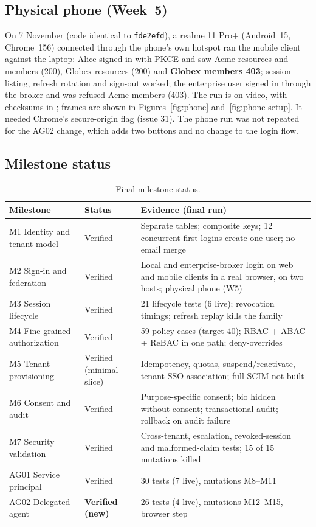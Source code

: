 \subsection{Physical phone (Week~5)}
On 7 November (code identical to \texttt{fde2efd}), a realme 11 Pro+ (Android~15, Chrome~156) connected through the phone's own hotspot ran the mobile client against the laptop: Alice signed in with PKCE and saw Acme resources and members (200), Globex resources (200) and \textbf{Globex members 403}; session listing, refresh rotation and sign-out worked; the enterprise user signed in through the broker and was refused Acme members (403). The run is on video, with checksums in ; frames are shown in Figures~\ref{fig:phone} and~\ref{fig:phone-setup}. It needed Chrome's secure-origin flag (issue 31). The phone run was not repeated for the AG02 change, which adds two buttons and no change to the login flow.

\subsection{Milestone status}
\begin{table}[H]
\centering
\small
\begin{tabularx}{\textwidth}{@{}P{3.9cm} P{2.3cm} L@{}}
\toprule
\textbf{Milestone} & \textbf{Status} & \textbf{Evidence (final run)}\\
\midrule
M1 Identity and tenant model & Verified & Separate tables; composite keys; 12 concurrent first logins create one user; no email merge\\
M2 Sign-in and federation & Verified & Local and enterprise-broker login on web and mobile clients in a real browser, on two hosts; physical phone (W5)\\
M3 Session lifecycle & Verified & 21 lifecycle tests (6 live); revocation timings; refresh replay kills the family\\
M4 Fine-grained authorization & Verified & 59 policy cases (target 40); RBAC + ABAC + ReBAC in one path; deny-overrides\\
M5 Tenant provisioning & Verified (minimal slice) & Idempotency, quotas, suspend/reactivate, tenant SSO association; full SCIM not built\\
M6 Consent and audit & Verified & Purpose-specific consent; bio hidden without consent; transactional audit; rollback on audit failure\\
M7 Security validation & Verified & Cross-tenant, escalation, revoked-session and malformed-claim tests; 15 of 15 mutations killed\\
AG01 Service principal & Verified & 30 tests (7 live), mutations M8--M11\\
AG02 Delegated agent & \textbf{Verified (new)} & 26 tests (4 live), mutations M12--M15, browser step\\
\bottomrule
\end{tabularx}
\caption{Final milestone status.}
\end{table}
